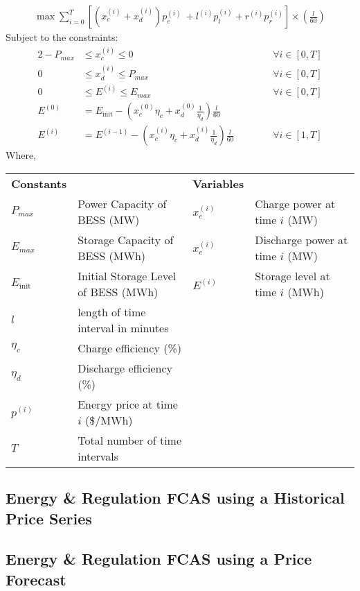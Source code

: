 \begin{align*}
  \max \sum_{i=0}^T 
   \left[  \left(x^{(i)}_c + x^{(i)}_d \right) p_{e}^{(i)} \
    + l^{(i)} p_{l}^{(i)} + r^{(i)} p_r^{(i)}  \right] \times \left( \frac{l}{60} \right)
\end{align*}
Subject to the constraints:
\begin{alignat} {2}
    -P_{max} &\leq x^{(i)}_c \leq 0  &&\forall i \in [0,T]\\
    0 &\leq x^{(i)}_d \leq P_{max}  &&\forall i \in [0,T]\\
    0 &\leq E^{(i)} \leq E_{max} &&\forall i \in [0,T] \\
    E^{(0)} &= E_{\text{init}} - \left(x^{(0)}_c \eta_c + x^{(0)}_d \frac{1}{\eta_d} \right) \frac{l}{60} && \\
    E^{(i)} &= E^{(i-1)} - \left(x^{(i)}_c \eta_c + x^{(i)}_d \frac{1}{\eta_d} \right) \frac{l}{60} \hspace{1cm} &&\forall i \in [1,T] 
\end{alignat}
Where,
{\renewcommand{\arraystretch}{2}}
\begin{center}
    \begin{tabular}{p{0.8cm} p{5.5cm} p{0.8cm} p{5.5cm}}
    \textbf{Constants} & & \textbf{Variables} & \\
    $P_{max}$ & Power Capacity of BESS (MW) & $x^{(i)}_c$ & Charge power at time $i$ (MW)   \\ 
    $E_{max}$ & Storage Capacity of BESS (MWh) & $x^{(i)}_c$&  Discharge power at time $i$ (MW)  \\
    $E_{\text{init}}$ & Initial Storage Level of BESS (MWh)& $E^{(i)}$ &Storage level at time $i$ (MWh)\\
    $l$ & length of time interval in minutes & & \\
    $\eta_c$ & Charge efficiency (\%) & &\\
    $\eta_d$ & Discharge efficiency (\%) & &\\
    $p^{(i)}$ &  Energy price at time $i$ (\$/MWh) & &\\
    $T$ &  Total number of time intervals & &\\
    \end{tabular}
\end{center}

\subsection{Energy \& Regulation FCAS using a Historical Price Series}

\subsection{Energy \& Regulation FCAS using a Price Forecast}